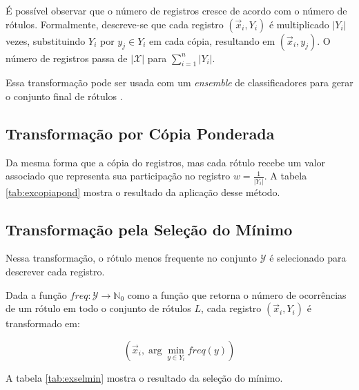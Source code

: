 \documentclass[runningheads,a4paper]{llncs}
\begin{document}
É possível observar que o número de registros cresce de acordo com o número de rótulos. Formalmente, descreve-se que cada registro $(\vec{x}_i,Y_i)$ é multiplicado $|Y_i|$ vezes, substituindo $Y_i$ por $y_j \in Y_i$ em cada cópia, resultando em $(\vec{x}_{i}, y_j)$. O número de registros passa de $|\mathcal{X}|$ para $\sum_{i=1}^{n}|Y_i|$.

Essa transformação pode ser usada com um \textit{ensemble} de classificadores para gerar o conjunto final de rótulos \cite{Joachims1998-zz} \cite{Yang1999-ah}.

\subsection{Transformação por Cópia Ponderada} \label{subsec:copiaponderada}

Da mesma forma que a cópia do registros, mas cada rótulo recebe um valor associado que representa sua participação no registro $w = \frac{1}{|Y_i|}$. A tabela \ref{tab:excopiapond} mostra o resultado da aplicação desse método.

\subsection{Transformação pela Seleção do Mínimo} \label{subsec:selecaominimo}

Nessa transformação, o rótulo menos frequente no conjunto $\mathcal{Y}$ é selecionado para descrever cada registro.

Dada a função $freq : \mathcal{Y} \to \mathbb{N}_0$ como a função que retorna o número de ocorrências de um rótulo em todo o conjunto de rótulos $L$, cada registro $(\vec{x}_i, Y_i)$ é transformado em:

$$(\vec{x}_i, \arg \min_{y \in Y_i} freq(y))$$

A tabela \ref{tab:exselmin} mostra o resultado da seleção do mínimo.
\end{document}
